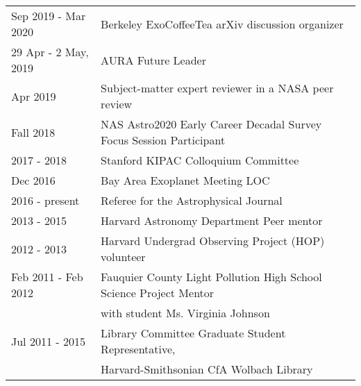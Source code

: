 \begin{tabular*}{\textwidth}{@{\hspace{10pt}}p{1.4in}l}
Sep 2019 - Mar 2020 & Berkeley ExoCoffeeTea arXiv discussion organizer \\ 
29 Apr - 2 May, 2019 & AURA Future Leader \\
Apr 2019 & Subject-matter expert reviewer in a NASA peer review \\
Fall 2018 & NAS Astro2020 Early Career Decadal Survey Focus Session Participant \\
2017 - 2018 & Stanford KIPAC Colloquium Committee \\
Dec 2016 & Bay Area Exoplanet Meeting LOC \\
2016 - present & Referee for the Astrophysical Journal \\
2013 - 2015 & Harvard Astronomy Department Peer mentor\\
2012 - 2013 & Harvard Undergrad Observing Project (HOP) volunteer\\
Feb 2011 - Feb 2012 & Fauquier County Light Pollution High School Science Project Mentor\\
& with student Ms. Virginia Johnson\\
Jul 2011 - 2015 & Library Committee Graduate Student Representative,\\
& Harvard-Smithsonian CfA Wolbach Library\\
\end{tabular*}

